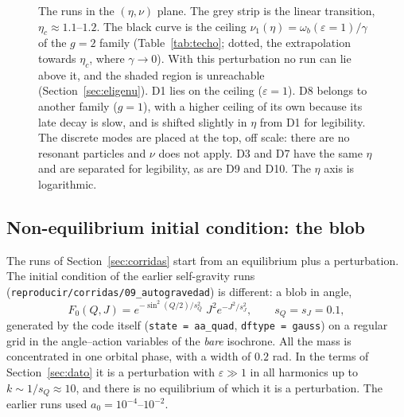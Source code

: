 \documentclass[11pt,a4paper]{article}
\begin{document}
\begin{figure}[htbp]
\caption{The runs in the $(\eta,\nu)$ plane. The grey strip is the linear transition,
$\eta_c\approx1.1$--$1.2$. The black curve is the ceiling $\nu_1(\eta)=\omega_b(\varepsilon=1)/\gamma$
of the $g=2$ family (Table~\ref{tab:techo}; dotted, the extrapolation towards $\eta_c$,
where $\gamma\to0$). With this perturbation no run can lie above it, and the shaded
region is unreachable (Section~\ref{sec:eligenu}). D1 lies on the ceiling ($\varepsilon=1$).
D8 belongs to another family ($g=1$), with a higher ceiling of its own because its late
decay is slow, and is shifted slightly in $\eta$ from D1 for legibility. The discrete
modes are placed at the top, off scale: there are no resonant particles and $\nu$ does
not apply. D3 and D7 have the same $\eta$ and are separated for legibility, as are D9
and D10. The $\eta$ axis is logarithmic.}
\label{fig:mapa}
\end{figure}

\subsection{Non-equilibrium initial condition: the blob}
\label{sec:bulto_diseno}

The runs of Section~\ref{sec:corridas} start from an equilibrium plus a perturbation. The initial condition of
the earlier self-gravity runs (\texttt{reproducir/corridas/09\_autogravedad}) is different:
a blob in angle,
\[
  F_0(Q,J)=e^{-\sin^2(Q/2)/s_Q^2}\;J^2e^{-J^2/s_J^2},\qquad s_Q=s_J=0.1,
\]
generated by the code itself (\texttt{state = aa\_quad}, \texttt{dftype = gauss}) on a regular
grid in the angle--action variables of the \emph{bare} isochrone. All the mass is
concentrated in one orbital phase, with a width of $0.2$ rad. In the terms of
Section~\ref{sec:dato} it is a perturbation with $\varepsilon\gg1$ in all harmonics up to
$k\sim1/s_Q\approx10$, and there is no equilibrium of which it is a perturbation. The earlier
runs used $a_0=10^{-4}$--$10^{-2}$.
\end{document}
